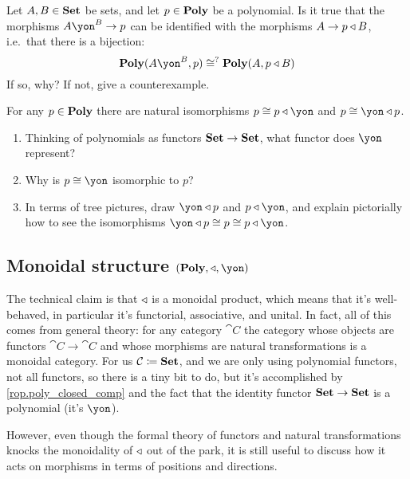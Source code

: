 \documentclass[DynamicalBook]{subfiles}
\begin{document}
\begin{exercise}
Let $A,B\in\textbf{Set}$ be sets, and let $p\in\textbf{Poly}$ be a polynomial. Is it true that the morphisms $A\yon^B\to p$ can be identified with the morphisms $A\to p\mathbin{\triangleleft} B$, i.e.\ that there is a bijection:
\begin{equation}\label{eqn.monomials_and_comp}
	\poly(A\yon^B,p)\cong^?\poly(A,p\tri B)
\end{equation}
If so, why? If not, give a counterexample.
\end{exercise}

\begin{exercise}\label{ex.compose_yon}
For any $p\in\textbf{Poly}$ there are natural isomorphisms $p\cong p\tri \yon$ and $p\cong\yon\tri p$.
\begin{enumerate}
	\item Thinking of polynomials as functors $\textbf{Set}\to\textbf{Set}$, what functor does $\yon$ represent?
	\item Why is $p\cong\yon$ isomorphic to $p$?
	\item In terms of tree pictures, draw $\yon\tri p$ and $p\tri\yon$, and explain pictorially how to see the isomorphisms $\yon\tri p\cong p\cong p\tri\yon$.
\qedhere
\end{enumerate}
\end{exercise}

\subsection{Monoidal structure $(\poly,\tri,\yon)$}\label{subsec.monoidal_struc_tri}

The technical claim is that $\mathbin{\triangleleft}$ is a monoidal product, which means that it's well-behaved, in particular it's functorial, associative, and unital. In fact, all of this comes from general theory: for any category $\cat{C}$ the category whose objects are functors $\cat{C}\to\cat{C}$ and whose morphisms are natural transformations is a monoidal category. For us $\mathcal{C}\coloneqq\textbf{Set}$, and we are only using polynomial functors, not all functors, so there is a tiny bit to do, but it's accomplished by \cref{rop.poly_closed_comp} and the fact that the identity functor $\textbf{Set}\to\textbf{Set}$ is a polynomial (it's $\yon$).

However, even though the formal theory of functors and natural transformations knocks the monoidality of $\mathbin{\triangleleft}$ out of the park, it is still useful to discuss how it acts on morphisms in terms of positions and directions.
\end{document}
